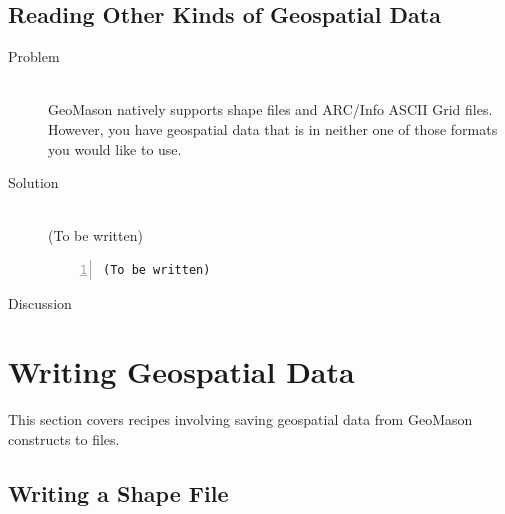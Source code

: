 \documentclass[twoside,10pt]{book}
\begin{document}
\subsection{Reading Other Kinds of Geospatial Data}
\label{sub:readingother}

\begin{description}
\item[Problem]~\\
GeoMason natively supports shape files and ARC/Info ASCII Grid files.
However, you have geospatial data that is in neither one of those
formats you would like to use.

\item[Solution]~\\
(To be written)
\begin{Verbatim}[frame=lines,framesep=5mm,numbers=left,commandchars=+\[\]]
(To be written)
\end{Verbatim}

\item[Discussion ]
\end{description}






\section{Writing Geospatial Data}
\label{sec:writingdata}

This section covers recipes involving saving geospatial data from
GeoMason constructs to files.

\subsection{Writing a Shape File}
\label{sub:writingshapefile}
\end{document}
